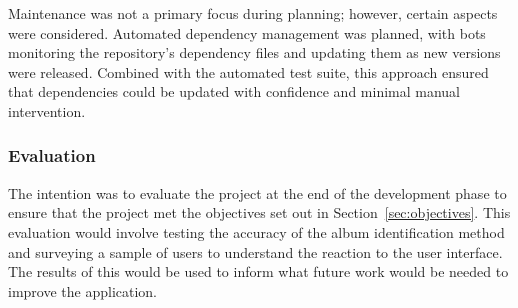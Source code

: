 Maintenance was not a primary focus during planning; however, certain aspects were considered. Automated dependency management was planned, with bots monitoring the repository’s dependency files and updating them as new versions were released. Combined with the automated test suite, this approach ensured that dependencies could be updated with confidence and minimal manual intervention.

\subsubsection{Evaluation}
The intention was to evaluate the project at the end of the development phase to ensure that the project met the objectives set out in Section~\ref{sec:objectives}. This evaluation would involve testing the accuracy of the album identification method and surveying a sample of users to understand the reaction to the user interface. The results of this would be used to inform what future work would be needed to improve the application.
